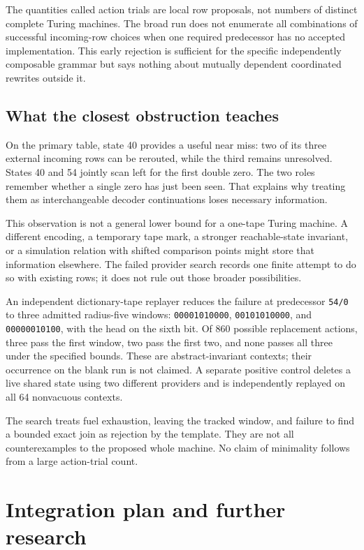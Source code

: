 \documentclass[11pt]{article}
\theoremstyle{definition}\newtheorem{definition}[theorem]{Definition}
\begin{document}
The quantities called action trials are local row proposals, not numbers of
distinct complete Turing machines. The broad run does not enumerate all
combinations of successful incoming-row choices when one required predecessor
has no accepted implementation. This early rejection is sufficient for the
specific independently composable grammar but says nothing about mutually
dependent coordinated rewrites outside it.

\subsection{What the closest obstruction teaches}

On the primary table, state 40 provides a useful near miss: two of
its three external incoming rows can be rerouted, while the third remains
unresolved. States 40 and 54 jointly scan left for the first double zero. The
two roles remember whether a single zero has just been seen. That explains
why treating them as interchangeable decoder continuations loses necessary
information.

This observation is not a general lower bound for a one-tape Turing machine.
A different encoding, a temporary tape mark, a stronger reachable-state
invariant, or a simulation relation with shifted comparison points might
store that information elsewhere. The failed provider search records one
finite attempt to do so with existing rows; it does not rule out those broader
possibilities.

An independent dictionary-tape replayer reduces the failure at predecessor
\texttt{54/0} to three admitted radius-five windows:
\texttt{00001010000}, \texttt{00101010000}, and \texttt{00000010100}, with
the head on the sixth bit. Of 860 possible replacement actions, three pass
the first window, two pass the first two, and none passes all three under the
specified bounds. These are abstract-invariant contexts; their occurrence on
the blank run is not claimed. A separate positive control deletes a live shared
state using two different providers and is independently replayed on all 64
nonvacuous contexts.

The search treats fuel exhaustion, leaving the tracked window, and failure to
find a bounded exact join as rejection by the template. They are not all
counterexamples to the proposed whole machine. No claim of minimality follows
from a large action-trial count.

\section{Integration plan and further research}
\end{document}
